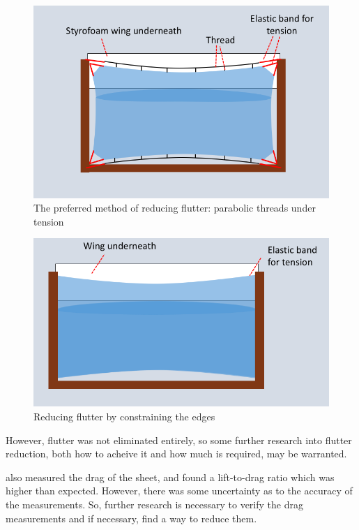 \documentclass[12pt]{report} %
\begin{document}
\begin{figure}
\includegraphics[width = \linewidth]{threads.png}
\caption{The preferred method of reducing flutter: parabolic threads under tension}
\label{threads}
\end{figure}

\begin{figure}
\includegraphics[width = \linewidth]{edges.png}
\caption{Reducing flutter by constraining the edges}
\label{edges}
\end{figure}

However, flutter was not eliminated entirely, so some further research into flutter reduction, both how to acheive it and how much is
required, may be warranted.

\cite{us} also measured the drag of the sheet, and found a lift-to-drag ratio which was higher than expected. However, there was some
uncertainty as to the accuracy of the measurements. So, further research is necessary to verify the drag measurements and if necessary,
find a way to reduce them.
\end{document}
